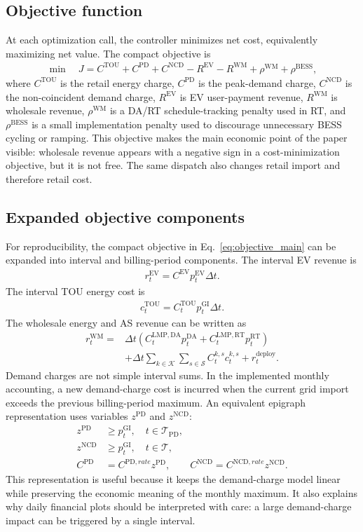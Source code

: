 \documentclass[final,5p,times]{elsarticle}
\newcommand{\DeltaT}{\Delta t}
\newcommand{\EV}{\mathrm{EV}}
\newcommand{\BESS}{\mathrm{BESS}}
\newcommand{\DA}{\mathrm{DA}}
\newcommand{\RT}{\mathrm{RT}}
\newcommand{\GI}{\mathrm{GI}}
\newcommand{\TOU}{\mathrm{TOU}}
\newcommand{\PD}{\mathrm{PD}}
\newcommand{\NCD}{\mathrm{NCD}}
\newcommand{\WM}{\mathrm{WM}}
\newcommand{\calT}{\mathcal{T}}
\newcommand{\calK}{\mathcal{K}}
\newcommand{\calS}{\mathcal{S}}
\begin{document}
\subsection{Objective function}
At each optimization call, the controller minimizes net cost, equivalently maximizing net value. The compact objective is
\begin{align}
\min \quad
J = C^{\TOU}+C^{\PD}+C^{\NCD}-R^{\EV}-R^{\WM}+\rho^{\WM}+\rho^{\BESS},
\label{eq:objective_main}
\end{align}
where $C^{\TOU}$ is the retail energy charge, $C^{\PD}$ is the peak-demand charge, $C^{\NCD}$ is the non-coincident demand charge, $R^{\EV}$ is EV user-payment revenue, $R^{\WM}$ is wholesale revenue, $\rho^{\WM}$ is a DA/RT schedule-tracking penalty used in RT, and $\rho^{\BESS}$ is a small implementation penalty used to discourage unnecessary BESS cycling or ramping. This objective makes the main economic point of the paper visible: wholesale revenue appears with a negative sign in a cost-minimization objective, but it is not free. The same dispatch also changes retail import and therefore retail cost.

\subsection{Expanded objective components}
For reproducibility, the compact objective in Eq.~\eqref{eq:objective_main} can be expanded into interval and billing-period components. The interval EV revenue is
\begin{align}
r_t^{\EV}=C^{\EV}p_t^{\EV}\DeltaT.
\label{eq:interval_ev_rev}
\end{align}
The interval TOU energy cost is
\begin{align}
c_t^{\TOU}=C_t^{\TOU}p_t^{\GI}\DeltaT.
\label{eq:interval_tou}
\end{align}
The wholesale energy and AS revenue can be written as
\begin{align}
r_t^{\WM}=&\DeltaT\left(C_t^{\mathrm{LMP},\DA}p_t^{\DA}+C_t^{\mathrm{LMP},\RT}p_t^{\RT}\right)\nonumber\\
&+\DeltaT\sum_{k\in\calK}\sum_{s\in\calS}C_t^{k,s}c_t^{k,s}+r_t^{\mathrm{deploy}}.
\label{eq:interval_wm_rev}
\end{align}
Demand charges are not simple interval sums. In the implemented monthly accounting, a new demand-charge cost is incurred when the current grid import exceeds the previous billing-period maximum. An equivalent epigraph representation uses variables $z^{\PD}$ and $z^{\NCD}$:
\begin{align}
z^{\PD}&\ge p_t^{\GI},\quad t\in\calT_{\PD},\label{eq:pd_epigraph}\\
z^{\NCD}&\ge p_t^{\GI},\quad t\in\calT,\label{eq:ncd_epigraph}\\
C^{\PD}&=C^{\PD,rate}z^{\PD},\qquad C^{\NCD}=C^{\NCD,rate}z^{\NCD}.\label{eq:dem_epigraph_cost}
\end{align}
This representation is useful because it keeps the demand-charge model linear while preserving the economic meaning of the monthly maximum. It also explains why daily financial plots should be interpreted with care: a large demand-charge impact can be triggered by a single interval.
\end{document}
